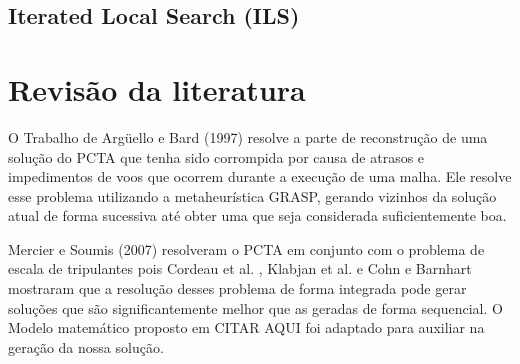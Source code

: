 \subsection{Iterated Local Search (ILS)}
\section{Revisão da literatura}
		
		O Trabalho de Argüello e Bard \citep{arguelo1007} (1997) resolve a parte de reconstrução de uma solução do PCTA que tenha sido corrompida por causa de atrasos e impedimentos de voos que ocorrem durante a execução de uma malha. Ele resolve esse problema utilizando a metaheurística GRASP, gerando vizinhos da solução atual de forma sucessiva até obter uma que seja considerada suficientemente boa.
		
		Mercier e Soumis \cite{mercier2007} (2007) resolveram o PCTA em conjunto com o problema de escala de tripulantes pois Cordeau et al. \cite{cordeau2001}, Klabjan et al. \cite{klabjan2002} e Cohn e Barnhart \cite{mainville2003} mostraram que a resolução desses problema de forma integrada pode gerar soluções que são significantemente melhor que as geradas de forma sequencial. O Modelo matemático proposto em CITAR AQUI foi adaptado para auxiliar na geração da nossa solução. 
		

